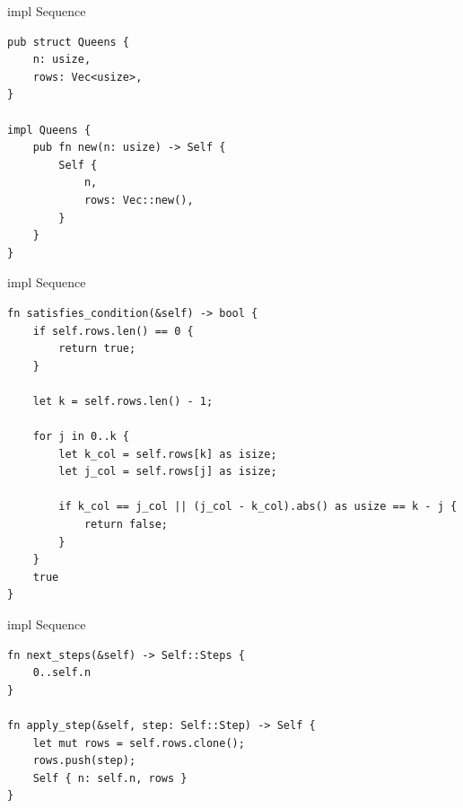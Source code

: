 \documentclass[aspectratio=43,t]{beamer}
\begin{document}
    \begin{frame}[fragile]{impl Sequence}
      \begin{verbatim}
pub struct Queens {
    n: usize,
    rows: Vec<usize>,
}

impl Queens {
    pub fn new(n: usize) -> Self {
        Self {
            n,
            rows: Vec::new(),
        }
    }
}
      \end{verbatim}
    \end{frame}
    \begin{frame}[fragile]{impl Sequence}
\begin{verbatim}
fn satisfies_condition(&self) -> bool {
    if self.rows.len() == 0 {
        return true;
    }

    let k = self.rows.len() - 1;

    for j in 0..k {
        let k_col = self.rows[k] as isize;
        let j_col = self.rows[j] as isize;

        if k_col == j_col || (j_col - k_col).abs() as usize == k - j {
            return false;
        }
    }
    true
}
\end{verbatim}
    \end{frame}
    \begin{frame}[fragile]{impl Sequence}
\begin{verbatim}
fn next_steps(&self) -> Self::Steps {
    0..self.n
}

fn apply_step(&self, step: Self::Step) -> Self {
    let mut rows = self.rows.clone();
    rows.push(step);
    Self { n: self.n, rows }
}
\end{verbatim}
    \end{frame}
\end{document}

